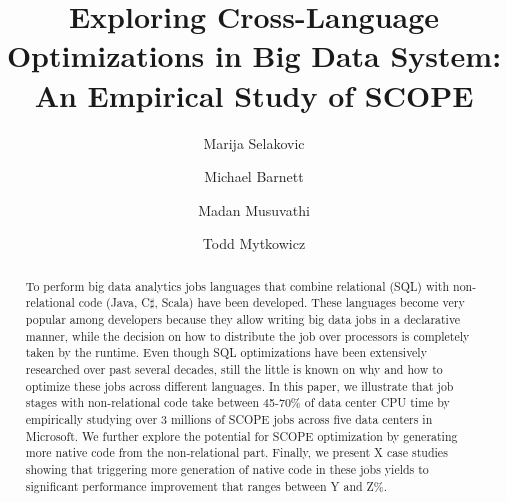 \documentclass[sigconf, anonymous]{acmart}
\begin{document}
\title{Exploring Cross-Language Optimizations in Big Data System: An Empirical Study of SCOPE}


\author{Marija Selakovic}


\author{Michael Barnett}


\author{Madan Musuvathi}


  



\author{Todd Mytkowicz}


  


\renewcommand{\shortauthors}{M. Selakovic et al.}


\begin{abstract}

To perform big data analytics jobs languages that combine relational (SQL) with non-relational code (Java, C$\sharp$, Scala) have been developed.
These languages become very popular among developers because they allow writing big data jobs in a declarative manner, while the decision on how to distribute the job over processors is completely taken by the runtime. Even though SQL optimizations have been extensively researched over past several decades, still the little is known on why and how to optimize these jobs across different languages. In this paper, we illustrate that job stages with non-relational code take between 45-70\% of data center CPU time by empirically studying over 3 millions of SCOPE jobs across five data centers in Microsoft. We further explore the potential for SCOPE optimization by generating more native code from the non-relational part. Finally, we present X case studies showing that triggering more generation of native code in these jobs yields to significant performance improvement that ranges between Y and Z\%.

\end{abstract}
\end{document}
